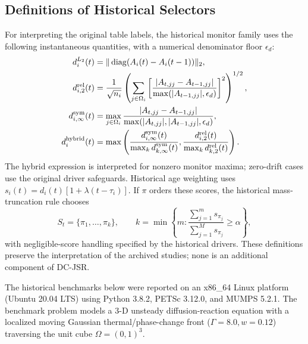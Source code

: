 \documentclass[preprint,12pt,3p]{elsarticle}
\begin{document}
\subsection{Definitions of Historical Selectors}
\label{subsec:historical_selector_definitions}
For interpreting the original table labels, the historical monitor family
uses the following instantaneous quantities, with a numerical denominator
floor $\epsilon_d$:
\begin{align}
d_i^{L_2}(t)&=\|\operatorname{diag}(A_i(t)-A_i(t-1))\|_2,
\label{eq:diag_proxy_l2}\\
d_{i,2}^{\rm rel}(t)&=\frac{1}{\sqrt{n_i}}
\left(\sum_{j\in\Omega_i}
\left[\frac{|A_{t,jj}-A_{t-1,jj}|}{\max(|A_{t-1,jj}|,\epsilon_d)}\right]^2\right)^{1/2},
\label{eq:diag_proxy_rell2}\\
d_{i,\infty}^{\rm sym}(t)&=\max_{j\in\Omega_i}
\frac{|A_{t,jj}-A_{t-1,jj}|}{\max(|A_{t,jj}|,|A_{t-1,jj}|,\epsilon_d)},
\label{eq:diag_proxy_linf}\\
d_i^{\rm hybrid}(t)&=\max\left(
\frac{d_{i,\infty}^{\rm sym}(t)}{\max_k d_{k,\infty}^{\rm sym}(t)},
\frac{d_{i,2}^{\rm rel}(t)}{\max_k d_{k,2}^{\rm rel}(t)}\right).
\label{eq:diag_proxy_hybrid}
\end{align}
The hybrid expression is interpreted for nonzero monitor maxima; zero-drift
cases use the original driver safeguards. Historical age weighting uses
$s_i(t)=d_i(t)[1+\lambda(t-\tau_i)]$. If $\pi$ orders these scores, the
historical mass-truncation rule chooses
\begin{equation}
S_t=\{\pi_1,\ldots,\pi_k\},\qquad
k=\min\left\{m:\frac{\sum_{j=1}^m s_{\pi_j}}
{\sum_{j=1}^M s_{\pi_j}}\ge\alpha\right\},
\label{eq:cumulative_drift_truncation}
\end{equation}
with negligible-score handling specified by the historical drivers.
These definitions preserve the interpretation of the archived studies;
none is an additional component of DC-JSR.

The historical benchmarks below were reported on an x86\_64 Linux platform (Ubuntu 20.04 LTS) using Python 3.8.2, PETSc 3.12.0, and MUMPS 5.2.1. The benchmark problem models a 3-D unsteady diffusion-reaction equation with a localized moving Gaussian thermal/phase-change front ($\Gamma = 8.0, w = 0.12$) traversing the unit cube $\Omega = (0, 1)^3$.
\end{document}
